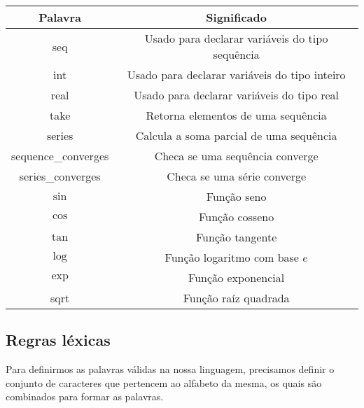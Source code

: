 \documentclass[a4 paper, 12pt]{article}
\begin{document}
\begin{table}[h]
\begin{center}
\begin{tabular}{|c|c|}
\hline
Palavra             & Significado                                                         \\ \hline
seq                 & Usado para declarar vari\'aveis do tipo sequ\^encia \\ \hline
int                 & Usado para declarar vari\'aveis do tipo inteiro                     \\ \hline
real                & Usado para declarar vari\'aveis do tipo real                        \\ \hline
take                & Retorna elementos de uma sequ\^encia                \\ \hline
series              & Calcula a soma parcial de uma sequ\^encia           \\ \hline
sequence\_converges & Checa se uma sequ\^encia converge                   \\ \hline
series\_converges   & Checa se uma s\'erie converge                   \\ \hline
$\sin$              & Fun\c c\~ao seno                                                    \\ \hline
$\cos$              & Fun\c c\~ao cosseno                                                 \\ \hline
$\tan$              & Fun\c c\~ao tangente                                                \\ \hline
$\log$              & Fun\c c\~ao logaritmo com base $e$                                  \\ \hline
$\exp$              & Fun\c c\~ao exponencial                                             \\ \hline
sqrt                & Fun\c c\~ao ra\'iz quadrada                                         \\ \hline
\end{tabular}
\end{center}
\end{table}

\subsection{Regras l\'exicas}

Para definirmos as palavras v\'alidas na nossa linguagem, precisamos
definir o conjunto de caracteres que pertencem ao alfabeto da mesma,
os quais s\~ao combinados para formar as palavras.
\end{document}
